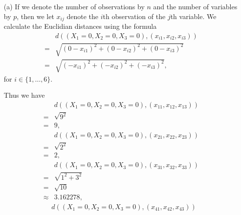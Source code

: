 
\begin{itemize}
    \item[(a)] If we denote the number of observations by $n$ and the number of 
    variables by $p$, then we let $x_{ij}$ denote the $i$th observation of the 
    $j$th variable. We calculate the Euclidian distances using the formula
    \begin{equation*}
        \begin{split}
            &d((X_1 = 0, X_2 = 0, X_3 = 0), (x_{i1}, x_{i2}, x_{i3})) \\
            = &\sqrt{{(0 - x_{i1})}^2 + {(0 - x_{i2})}^2 + {(0 - x_{i3})}^2} \\
            = &\sqrt{{(-x_{i1})}^2 + {(-x_{i2})}^2 + {(-x_{i3})}^2},
        \end{split}
    \end{equation*}
    for $i \in \lbrace 1, \dotsc, 6\rbrace$.\par
    Thus we have
    \begin{equation*}
        \begin{split}
            &d((X_1 = 0, X_2 = 0, X_3 = 0), (x_{11}, x_{12}, x_{13})) \\
            = &\sqrt{9^2} \\ 
            = &9,
        \end{split}
    \end{equation*}
    \begin{equation*}
        \begin{split}
            &d((X_1 = 0, X_2 = 0, X_3 = 0), (x_{21}, x_{22}, x_{23})) \\ 
            = &\sqrt{2^2} \\ 
            = &2,
        \end{split}
    \end{equation*}
    \begin{equation*}
        \begin{split}
            &d((X_1 = 0, X_2 = 0, X_3 = 0), (x_{31}, x_{32}, x_{33})) \\ 
            = &\sqrt{1^2 + 3^2} \\
            = &\sqrt{10} \\
            \approx &3.162278,
        \end{split}
    \end{equation*}
    \begin{equation*}
        \begin{split}
            &d((X_1 = 0, X_2 = 0, X_3 = 0), (x_{41}, x_{42}, x_{43})) \\

\end{split}
\end{equation*}
\end{itemize}
